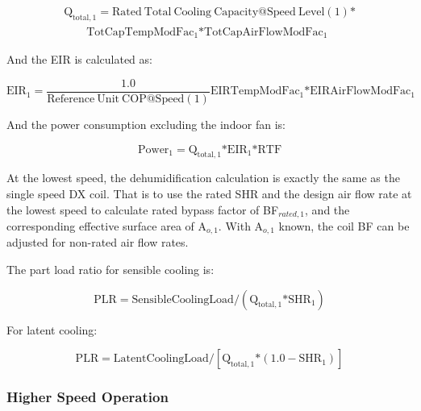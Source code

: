 \begin{equation}
  \begin{array}{l}
    \mathrm{Q}_{\mathrm{total},1} = \mathrm{Rated~Total~Cooling~Capacity} @ \mathrm{Speed~Level} \left( 1 \right) \mathrm{*} \\
    \quad \quad \mathrm{TotCapTempModFa} \mathrm{c}_1 \mathrm{*TotCapAirFlowModFa} \mathrm{c}_1
  \end{array}
\end{equation}

And the EIR is calculated as:

\begin{equation}
\mathrm{EI} \mathrm{R}_1 = \frac{1.0}{\mathrm{Reference~Unit~COP} @ \mathrm{Speed}(1)}{\mathrm{EIRTempModFa}}{\mathrm{c}_1}{\mathrm{*EIRAirFlowModFa}}{\mathrm{c}_1}
\end{equation}

And the power consumption excluding the indoor fan is:

\begin{equation}
{\mathrm{Powe}}{{\mathrm{r}}_1} = {{\mathrm{Q}}_{{\mathrm{total}},1}}{\mathrm{*EI}}{{\mathrm{R}}_1}{\mathrm{*RTF}}
\end{equation}

At the lowest speed, the dehumidification calculation is exactly the same as the single speed DX coil. That is to use the rated SHR and the design air flow rate at the lowest speed to calculate rated bypass factor of BF\(_{rated,1}\), and the corresponding effective surface area of A\(_{o,1}\). With A\(_{o,1}\) known, the coil BF can be adjusted for non-rated air flow rates.

The part load ratio for sensible cooling is:

\begin{equation}
{\mathrm{PLR}} = {\mathrm{SensibleCoolingLoad}}/({{\mathrm{Q}}_{{\mathrm{total}},1}}{\mathrm{*SH}}{{\mathrm{R}}_1})
\end{equation}

For latent cooling:

\begin{equation}
{\mathrm{PLR}} = {\mathrm{LatentCoolingLoad}}/[{{\mathrm{Q}}_{{\mathrm{total}},1}}{\mathrm{*}}(1.0 - {\mathrm{SH}}{{\mathrm{R}}_1})]
\end{equation}

\subsubsection{Higher Speed Operation}\label{higher-speed-operation-1-000}

